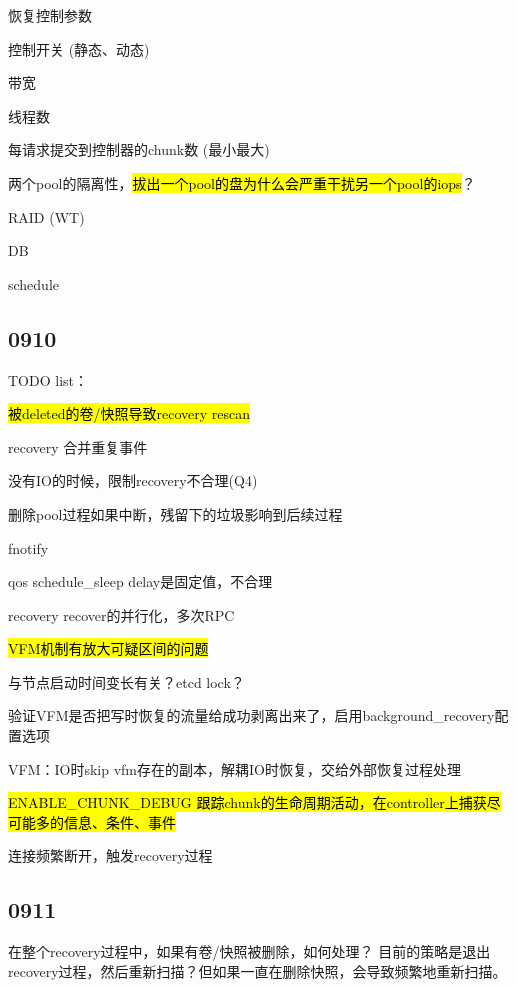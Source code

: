 恢复控制参数
\begin{enumbox}
\item 控制开关 (静态、动态)
\item 带宽
\item 线程数
\item 每请求提交到控制器的chunk数 (最小最大)
\end{enumbox}

两个pool的隔离性，\hl{拔出一个pool的盘为什么会严重干扰另一个pool的iops}？
\begin{enumbox}
\item RAID (WT)
\item DB
\item schedule
\end{enumbox}

\subsection{0910}

TODO list：
\begin{enumbox}
\item \hl{被deleted的卷/快照导致recovery rescan}
\item recovery 合并重复事件
\item 没有IO的时候，限制recovery不合理(Q4)
\item 删除pool过程如果中断，残留下的垃圾影响到后续过程
\item fnotify
\item qos schedule\_sleep delay是固定值，不合理
\item recovery recover的并行化，多次RPC
\item \hl{VFM机制有放大可疑区间的问题}
\item 与节点启动时间变长有关？etcd lock？
\item 验证VFM是否把写时恢复的流量给成功剥离出来了，启用background\_recovery配置选项
\item VFM：IO时skip vfm存在的副本，解耦IO时恢复，交给外部恢复过程处理
\item \hl{ENABLE\_CHUNK\_DEBUG 跟踪chunk的生命周期活动，在controller上捕获尽可能多的信息、条件、事件}
\item 连接频繁断开，触发recovery过程
\end{enumbox}

\subsection{0911}

在整个recovery过程中，如果有卷/快照被删除，如何处理？
目前的策略是退出recovery过程，然后重新扫描？但如果一直在删除快照，会导致频繁地重新扫描。

